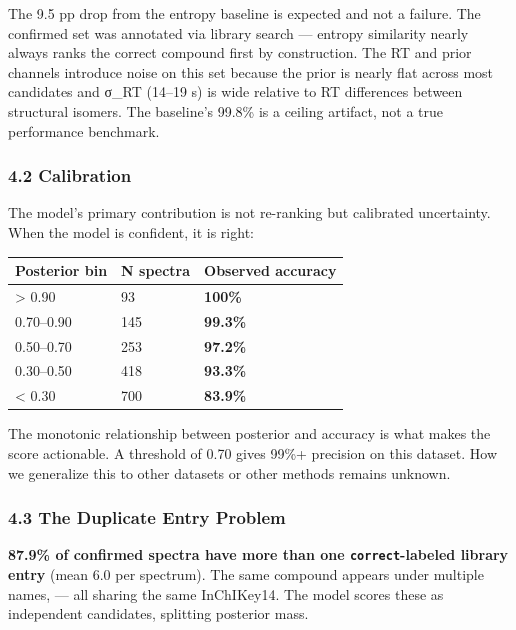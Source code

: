 The 9.5 pp drop from the entropy baseline is expected and not a failure.
The confirmed set was annotated via library search --- entropy
similarity nearly always ranks the correct compound first by
construction. The RT and prior channels introduce noise on this set
because the prior is nearly flat across most candidates and σ\_RT
(14--19 s) is wide relative to RT differences between structural
isomers. The baseline's 99.8\% is a ceiling artifact, not a true
performance benchmark.

\subsubsection{4.2 Calibration}\label{calibration}

The model's primary contribution is not re-ranking but calibrated
uncertainty. When the model is confident, it is right:

{\def\LTcaptype{none} %
\begin{longtable}[]{@{}lll@{}}
\toprule\noalign{}
Posterior bin & N spectra & Observed accuracy \\
\midrule\noalign{}
\endhead
\bottomrule\noalign{}
\endlastfoot
\textgreater{} 0.90 & 93 & \textbf{100\%} \\
0.70--0.90 & 145 & \textbf{99.3\%} \\
0.50--0.70 & 253 & \textbf{97.2\%} \\
0.30--0.50 & 418 & \textbf{93.3\%} \\
\textless{} 0.30 & 700 & \textbf{83.9\%} \\
\end{longtable}
}

The monotonic relationship between posterior and accuracy is what makes
the score actionable. A threshold of 0.70 gives 99\%+ precision on this
dataset. How we generalize this to other datasets or other methods
remains unknown.

\subsubsection{4.3 The Duplicate Entry
Problem}\label{the-duplicate-entry-problem}

\textbf{87.9\% of confirmed spectra have more than one
\texttt{correct}-labeled library entry} (mean 6.0 per spectrum). The
same compound appears under multiple names, --- all sharing the same
InChIKey14. The model scores these as independent candidates, splitting
posterior mass.

